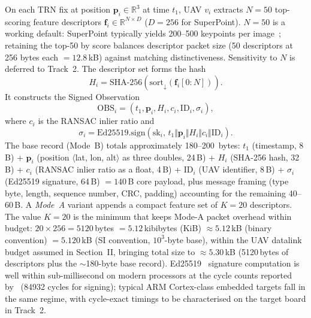 \documentclass[conference,10pt]{IEEEtran}
\begin{document}
On each TRN fix at position $\mathbf{p}_i \in \mathbb{R}^3$ at time $t_1$, UAV $v_i$ extracts $N=50$ top-scoring feature descriptors $\mathbf{f}_i \in \mathbb{R}^{N\times D}$ ($D{=}256$ for SuperPoint). $N=50$ is a working default: SuperPoint typically yields 200--500 keypoints per image~\cite{detone2018superpoint}; retaining the top-50 by score balances descriptor packet size (50 descriptors at 256 bytes each $= 12.8$\,kB) against matching distinctiveness. Sensitivity to $N$ is deferred to Track~2. The descriptor set forms the hash
\begin{equation}
H_i = \mathrm{SHA\text{-}256}\!\left(\mathrm{sort}_\downarrow(\mathbf{f}_i[0\!:\!N])\right).
\end{equation}
It constructs the Signed Observation
\begin{equation}
\mathrm{OBS}_i = \left(t_1, \mathbf{p}_i, H_i, c_i, \mathrm{ID}_i, \sigma_i\right),
\end{equation}
where $c_i$ is the RANSAC inlier ratio and
\begin{equation}
\sigma_i = \mathrm{Ed25519.sign}\!\left(\mathrm{sk}_i,\, t_1 \Vert \mathbf{p}_i \Vert H_i \Vert c_i \Vert \mathrm{ID}_i\right).
\end{equation}
The base record (Mode~B) totals approximately 180--200~bytes: $t_1$ (timestamp, 8\,B) + $\mathbf{p}_i$ (position $\langle$lat, lon, alt$\rangle$ as three doubles, 24\,B) + $H_i$ (SHA-256 hash, 32\,B) + $c_i$ (RANSAC inlier ratio as a float, 4\,B) + $\mathrm{ID}_i$ (UAV identifier, 8\,B) + $\sigma_i$ (Ed25519 signature, 64\,B) $= 140$\,B core payload, plus message framing (type byte, length, sequence number, CRC, padding) accounting for the remaining 40--60\,B. A \emph{Mode~A} variant appends a compact feature set of $K=20$ descriptors. The value $K=20$ is the minimum that keeps Mode-A packet overhead within budget: $20 \times 256 = 5120$\,bytes $= 5.12$\,kibibytes (KiB) $\approx 5.12$\,kB (binary convention) $= 5.120$\,kB (SI convention, $10^3$-byte base), within the UAV datalink budget assumed in Section~II, bringing total size to $\approx 5.30$\,kB (5120\,bytes of descriptors plus the $\sim$180-byte base record). Ed25519~\cite{bernstein2012ed25519} signature computation is well within sub-millisecond on modern processors at the cycle counts reported by~\cite{bernstein2012ed25519} (84932 cycles for signing); typical ARM Cortex-class embedded targets fall in the same regime, with cycle-exact timings to be characterised on the target board in Track~2.
\end{document}
